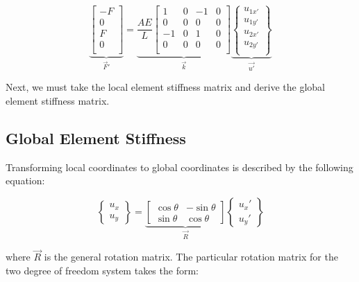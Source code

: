 \begin{equation}
	\underbrace{
		\begin{bmatrix}
			-F\\ 0\\ F\\ 0\\
		\end{bmatrix}
	}_{\vec{F}'}
	=
	\underbrace{
		\frac{AE}{L}
		\begin{bmatrix}
			1 & 0 & -1 & 0\\
			0 & 0 & 0 & 0\\
			-1 & 0 & 1 & 0\\
			0 & 0 & 0 & 0\\
		\end{bmatrix}
	}_{\vec{k}}
	\underbrace{
		\begin{Bmatrix}
			u_{1x'}\\ u_{1y'}\\ u_{2x'}\\ u_{2y'}\\
		\end{Bmatrix}
	}_{\vec{u'}}
	\label{Eq:F=ku}
\end{equation}

Next, we must take the local element stiffness matrix and derive the global element stiffness matrix.

\subsection{Global Element Stiffness}

Transforming local coordinates to global coordinates is described by the following equation:

\begin{equation}
	\begin{Bmatrix}
		u_x\\ u_y
	\end{Bmatrix}
	=
	\underbrace{
		\begin{bmatrix}
			\cos\theta & -\sin\theta\\
			\sin\theta & \cos\theta
	\end{bmatrix}
	}_{\vec{R}}
	\begin{Bmatrix}
		u_x'\\ u_y'
	\end{Bmatrix}
\end{equation}

where $\vec{R}$ is the general rotation matrix. The particular rotation matrix for the two degree of freedom system takes the form:

